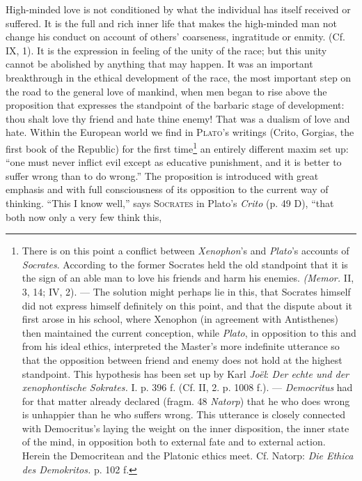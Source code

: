 \documentclass[12pt,a4paper,openany]{book}
\newcommand{\opage}[1]{\marginnote{\footnotesize\textit{[#1]}}}
\begin{document}
High-minded love is not conditioned by what the individual has itself received or suffered. It is the full and rich
inner life that makes the high-minded man not change his conduct on account of others' coarseness, ingratitude or
enmity. (Cf. IX, 1). It is the expression in feeling of the unity of the race; but this unity cannot be abolished by
anything that may happen. It was an important breakthrough in the ethical development of the race, the most important
step on the road to the general love of mankind, when men began to rise above the proposition that expresses the
standpoint of the barbaric stage of development: thou shalt love thy
\opage{246}friend and hate thine enemy! That was a dualism of love and hate. Within the European world we find in
\textsc{Plato}'s writings (Crito, Gorgias, the first book of the Republic) for the first time\footnote[1]{There is on
this point a conflict between \emph{Xenophon}'s and \emph{Plato}'s accounts of \emph{Socrates}. According to the
former Socrates held the old standpoint that it is the sign of an able man to love his friends and harm his enemies.
\textit{(Memor.} II, 3, 14; IV, 2). --- The solution might perhaps lie in this, that Socrates himself did not express
himself definitely on this point, and that the dispute about it first arose in his school, where Xenophon (in
agreement with Antisthenes) then maintained the current conception, while \emph{Plato}, in opposition to this and from
his ideal ethics, interpreted the Master's more indefinite utterance so that the opposition between friend and enemy
does not hold at the highest standpoint. This hypothesis has been set up by Karl \emph{Joël}: \textit{Der echte und
der xenophontische Sokrates.} I. p. 396 f. (Cf. II, 2. p. 1008 f.). --- \emph{Democritus} had for that matter already
declared (fragm. 48 \emph{Natorp}) that he who does wrong is unhappier than he who suffers wrong. This utterance is
closely connected with Democritus's laying the weight on the inner disposition, the inner state of the mind, in
opposition both to external fate and to external action. Herein the Democritean and the Platonic ethics meet. Cf.
Natorp: \textit{Die Ethica des Demokritos.} p. 102 f.} an entirely different maxim set up: ``one must never inflict
evil except as educative punishment, and it is better to suffer wrong than to do wrong.'' The proposition is
introduced with great emphasis and with full consciousness of its opposition to the current way of thinking. ``This I
know well,'' says \textsc{Socrates} in Plato's \textit{Crito} (p. 49 D), ``that both now only a very few think this,
\end{document}
